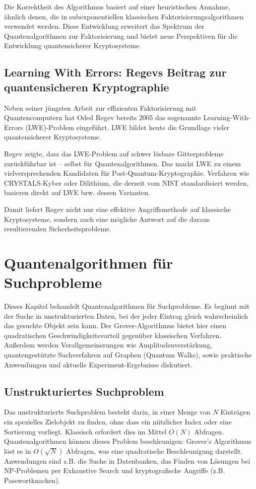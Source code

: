 Die Korrektheit des Algorithmus basiert auf einer heuristischen Annahme, ähnlich denen, die in subexponentiellen klassischen Faktorisierungsalgorithmen verwendet werden. Diese Entwicklung erweitert das Spektrum der Quantenalgorithmen zur Faktorisierung und bietet neue Perspektiven für die Entwicklung quantensicherer Kryptosysteme.

\subsection{Learning With Errors: Regevs Beitrag zur quantensicheren Kryptographie}

Neben seiner jüngsten Arbeit zur effizienten Faktorisierung mit Quantencomputern hat Oded Regev bereits 2005 das sogenannte Learning-With-Errors (LWE)-Problem eingeführt. LWE bildet heute die Grundlage vieler quantensicherer Kryptosysteme. 

Regev zeigte, dass das LWE-Problem auf schwer lösbare Gitterprobleme zurückführbar ist – selbst für Quantenalgorithmen. Das macht LWE zu einem vielversprechenden Kandidaten für Post-Quantum-Kryptographie. Verfahren wie CRYSTALS-Kyber oder Dilithium, die derzeit vom NIST standardisiert werden, basieren direkt auf LWE bzw. dessen Varianten.

Damit liefert Regev nicht nur eine effektive Angriffsmethode auf klassische Kryptosysteme, sondern auch eine mögliche Antwort auf die daraus resultierenden Sicherheitsprobleme.

\section{Quantenalgorithmen für Suchprobleme}

Dieses Kapitel behandelt Quantenalgorithmen für Suchprobleme. Es beginnt mit der Suche in unstrukturierten Daten, bei der jeder Eintrag gleich wahrscheinlich das gesuchte Objekt sein kann. Der Grover-Algorithmus bietet hier einen quadratischen Geschwindigkeitsvorteil gegenüber klassischen Verfahren. Außerdem werden Verallgemeinerungen wie Amplitudenverstärkung, quantengestützte Suchverfahren auf Graphen (Quantum Walks), sowie praktische Anwendungen und aktuelle Experiment-Ergebnisse diskutiert.

\subsection{Unstrukturiertes Suchproblem}

Das unstrukturierte Suchproblem besteht darin, in einer Menge von $N$ Einträgen ein spezielles Zielobjekt zu finden, ohne dass ein nützlicher Index oder eine Sortierung vorliegt. Klassisch erfordert dies im Mittel $O(N)$ Abfragen.\\
Quantenalgorithmen können dieses Problem beschleunigen: Grover’s Algorithmus löst es in $O(\sqrt{N})$ Abfragen, was eine quadratische Beschleunigung darstellt.\\
Anwendungen sind z.B. die Suche in Datenbanken, das Finden von Lösungen bei NP-Problemen per Exhaustive Search und kryptografische Angriffe (z.B. Passwortknacken).

